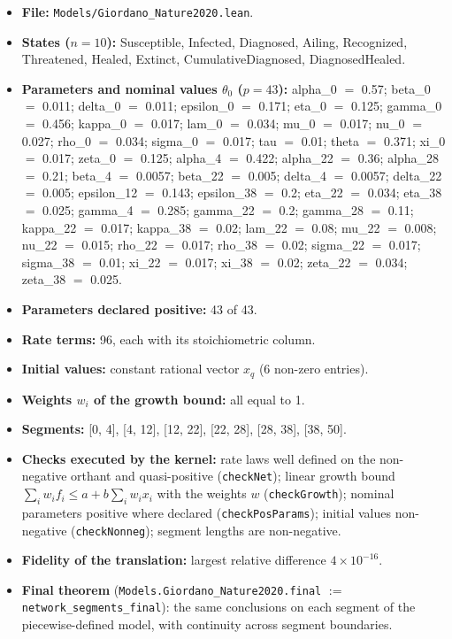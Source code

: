 \begin{itemize}\itemsep0pt\small
\item \textbf{File:} \texttt{Models/Giordano\_Nature2020.lean}.
\item \textbf{States ($n=10$):} Susceptible, Infected, Diagnosed, Ailing, Recognized, Threatened, Healed, Extinct, CumulativeDiagnosed, DiagnosedHealed.
\item \textbf{Parameters and nominal values $\theta_0$ ($p=43$):} alpha\_0 $=$ 0.57; beta\_0 $=$ 0.011; delta\_0 $=$ 0.011; epsilon\_0 $=$ 0.171; eta\_0 $=$ 0.125; gamma\_0 $=$ 0.456; kappa\_0 $=$ 0.017; lam\_0 $=$ 0.034; mu\_0 $=$ 0.017; nu\_0 $=$ 0.027; rho\_0 $=$ 0.034; sigma\_0 $=$ 0.017; tau $=$ 0.01; theta $=$ 0.371; xi\_0 $=$ 0.017; zeta\_0 $=$ 0.125; alpha\_4 $=$ 0.422; alpha\_22 $=$ 0.36; alpha\_28 $=$ 0.21; beta\_4 $=$ 0.0057; beta\_22 $=$ 0.005; delta\_4 $=$ 0.0057; delta\_22 $=$ 0.005; epsilon\_12 $=$ 0.143; epsilon\_38 $=$ 0.2; eta\_22 $=$ 0.034; eta\_38 $=$ 0.025; gamma\_4 $=$ 0.285; gamma\_22 $=$ 0.2; gamma\_28 $=$ 0.11; kappa\_22 $=$ 0.017; kappa\_38 $=$ 0.02; lam\_22 $=$ 0.08; mu\_22 $=$ 0.008; nu\_22 $=$ 0.015; rho\_22 $=$ 0.017; rho\_38 $=$ 0.02; sigma\_22 $=$ 0.017; sigma\_38 $=$ 0.01; xi\_22 $=$ 0.017; xi\_38 $=$ 0.02; zeta\_22 $=$ 0.034; zeta\_38 $=$ 0.025.
\item \textbf{Parameters declared positive:} 43 of 43.
\item \textbf{Rate terms:} 96, each with its stoichiometric column.
\item \textbf{Initial values:} constant rational vector $x_q$ (6 non-zero entries).
\item \textbf{Weights $w_i$ of the growth bound:} all equal to 1.
\item \textbf{Segments:} [0, 4], [4, 12], [12, 22], [22, 28], [28, 38], [38, 50].
\item \textbf{Checks executed by the kernel:} rate laws well defined on the non-negative orthant and quasi-positive (\texttt{checkNet}); linear growth bound $\sum_iw_if_i\le a+b\sum_iw_ix_i$ with the weights $w$ (\texttt{checkGrowth}); nominal parameters positive where declared (\texttt{checkPosParams}); initial values non-negative (\texttt{checkNonneg}); segment lengths are non-negative.
\item \textbf{Fidelity of the translation:} largest relative difference $4\times10^{-16}$.
\item \textbf{Final theorem} (\texttt{Models.Giordano\_Nature2020.final} $:=$ \texttt{network\_segments\_final}): the same conclusions on each segment of the piecewise-defined model, with continuity across segment boundaries.
\end{itemize}

